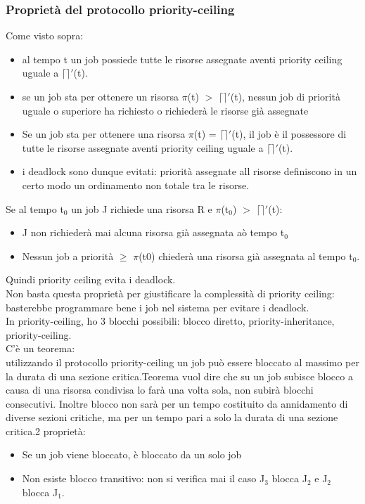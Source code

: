 \documentclass[12pt, oneside]{extbook}
\begin{document}
\subsubsection{Proprietà del protocollo priority-ceiling}
Come visto sopra:
\begin{itemize}
\item al tempo t un job possiede tutte le risorse assegnate aventi priority ceiling uguale a $\lceil\rceil'$(t).
\item se un job sta per ottenere un risorsa $\pi$(t) $>$ $\lceil\rceil'$(t), nessun job di priorità uguale o superiore ha richiesto o richiederà le risorse già assegnate
\item Se un job sta per ottenere una risorsa $\pi$(t) = $\lceil\rceil'$(t), il job è il possessore di tutte le risorse assegnate aventi priority ceiling uguale a $\lceil\rceil'$(t).
\item i deadlock sono dunque evitati: priorità assegnate all risorse definiscono in un certo modo un ordinamento non totale tra le risorse.
\end{itemize}
Se al tempo t$_{0}$ un job J richiede una risorsa R e $\pi$(t$_{0}$) $>$ $\lceil\rceil'$(t): 
\begin{itemize}
\item J non richiederà mai alcuna risorsa già assegnata aò tempo t$_{0}$
\item Nessun job a priorità $\geq$ $\pi$(t${0}$) chiederà una risorsa già assegnata al tempo t$_{0}$.
\end{itemize}
Quindi priority ceiling evita i deadlock.\\ Non basta questa proprietà per giustificare la complessità di priority ceiling: basterebbe programmare bene i job nel sistema per evitare i deadlock.\\ In priority-ceiling, ho 3 blocchi possibili: blocco diretto, priority-inheritance, priority-ceiling.\\ C'è un teorema:\\ utilizzando il protocollo priority-ceiling un job può essere bloccato al massimo per la durata di una sezione critica.Teorema vuol dire che su un job subisce blocco a causa di una risorsa condivisa lo farà una volta sola, non subirà blocchi consecutivi. Inoltre blocco non sarà per un tempo costituito da annidamento di diverse sezioni critiche, ma per un tempo pari a solo la durata di una sezione critica.2 proprietà:
\begin{itemize}
\item Se un job viene bloccato, è bloccato da un solo job
\item Non esiste blocco transitivo: non si verifica mai il caso J$_{3}$ blocca J$_{2}$ e J$_{2}$ blocca J$_{1}$.
\end{itemize}
\end{document}
